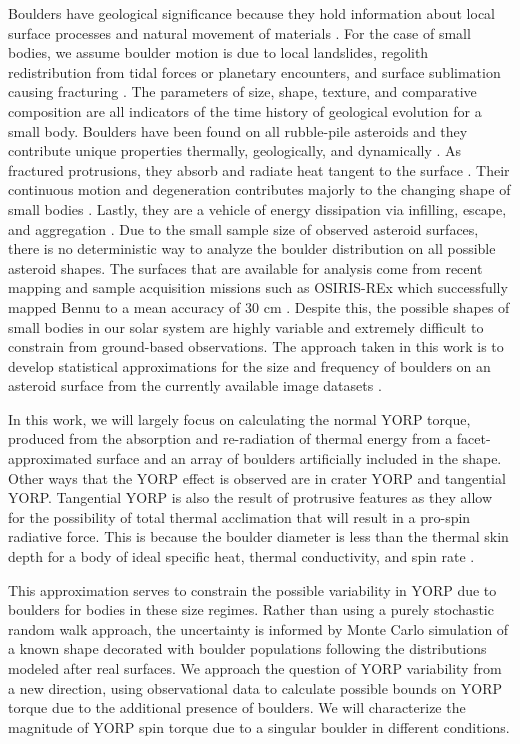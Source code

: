 Boulders have geological significance because they hold information about local surface processes and natural movement of materials \citep{Murdoch2015}. For the case of small bodies, we assume boulder motion is due to local landslides, regolith redistribution from tidal forces or planetary encounters, and surface sublimation causing fracturing \citep{Delbo2022} \citep{Barnouin2022}. The parameters of size, shape, texture, and comparative composition are all indicators of the time history of geological evolution for a small body. Boulders have been found on all rubble-pile asteroids and they contribute unique properties thermally, geologically, and dynamically \citep{Kuppers2012}. As fractured protrusions, they absorb and radiate heat tangent to the surface \citep{Golubov2022}. Their continuous motion and degeneration contributes majorly to the changing shape of small bodies \citep{Molaro2020} \citep{Scheeres2015}\citep{Scheeres2018}\citep{Zhang2022}. Lastly, they are a vehicle of energy dissipation via infilling, escape, and aggregation \citep{Holsapple2010}.
Due to the small sample size of observed asteroid surfaces, there is no deterministic way to analyze the boulder distribution on all possible asteroid shapes. The surfaces that are available for analysis come from recent mapping and sample acquisition missions such as OSIRIS-REx which successfully mapped Bennu to a mean accuracy of 30 cm \citep{Bennett2021}. Despite this, the possible shapes of small bodies in our solar system are highly variable and extremely difficult to constrain from ground-based observations. The approach taken in this work is to develop statistical approximations for the size and frequency of boulders on an asteroid surface from the currently available image datasets \citep{DellaGiustina2019}\citep{Fujiwara2006}\citep{Watanabe2019}.

In this work, we will largely focus on calculating the normal YORP torque, produced from the absorption and re-radiation of thermal energy from a facet-approximated surface and an array of boulders artificially included in the shape. Other ways that the YORP effect is observed are in crater YORP and tangential YORP. Tangential YORP is also the result of protrusive features as they allow for the possibility of total thermal acclimation that will result in a pro-spin radiative force. This is because the boulder diameter is less than the thermal skin depth for a body of ideal specific heat, thermal conductivity, and spin rate \citep{Golubov2017}.  


This approximation serves to constrain the possible variability in YORP due to boulders for bodies in these size regimes. Rather than using a purely stochastic random walk approach, the uncertainty is informed by Monte Carlo simulation of a known shape decorated with boulder populations following the distributions modeled after real surfaces. We approach the question of YORP variability from a new direction, using observational data to calculate possible bounds on YORP torque due to the additional presence of boulders. We will characterize the magnitude of YORP spin torque due to a singular boulder in different conditions.
